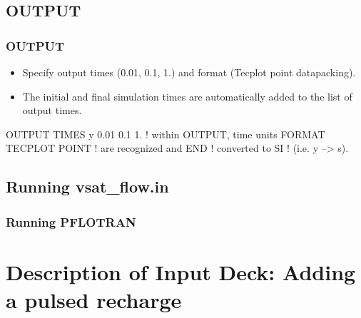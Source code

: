 \documentclass{beamer}
\newcommand\redcomment[1]{{{\color{red} #1}}}
\newcommand\bluecomment[1]{{{\color{blue} #1}}}
\newcommand\greencomment[1]{{{\color{green} #1}}}
\begin{document}
\subsection{OUTPUT}

\begin{frame}[fragile]\frametitle{OUTPUT}

\begin{itemize}
\item Specify output times (0.01, 0.1, 1.) and format (Tecplot point datapacking).
\item The initial and final simulation times are automatically added to the list of output times.
\end{itemize}


\begin{semiverbatim}

OUTPUT
  TIMES \redcomment{y} 0.01 0.1 1.     \bluecomment{! within OUTPUT, time units}
  FORMAT TECPLOT POINT    \bluecomment{!   are recognized and}
END                       \bluecomment{!   converted to SI}
                          \bluecomment{!   (i.e. \redcomment{y} --> \greencomment{s}).}
\end{semiverbatim}

\end{frame}

\subsection{Running vsat_flow.in}

\begin{frame}[fragile]\frametitle{Running PFLOTRAN}


\end{frame}

\section{Description of Input Deck: Adding a pulsed recharge}
\end{document}
